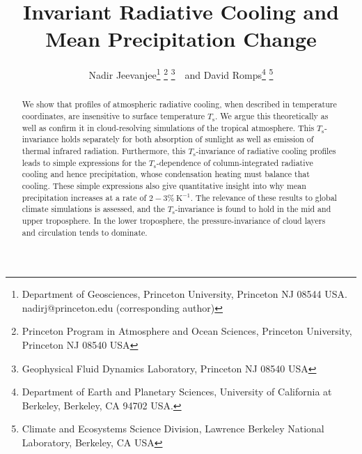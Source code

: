 \documentclass[10pt]{article}
\newcommand{\Ts}{\ensuremath{T_\mathrm{s}}}
\begin{document}
%
%


\title{Invariant Radiative Cooling and Mean Precipitation Change}

%
%


 \author{Nadir Jeevanjee\footnote{Department of Geosciences, Princeton University, Princeton NJ 08544 USA. nadirj@princeton.edu (corresponding author)} \footnote{Princeton Program in Atmosphere and Ocean Sciences, Princeton University, Princeton NJ 08540 USA} \footnote{Geophysical Fluid Dynamics Laboratory,  Princeton NJ  08540 USA}\ \    and David Romps\footnote{Department of Earth and Planetary Sciences, University of California at Berkeley, Berkeley, CA 94702  USA.} \footnote{Climate and Ecosystems Science Division, Lawrence Berkeley National Laboratory, Berkeley, CA USA}
}

\maketitle

\begin{abstract}
We show that  profiles of atmospheric radiative cooling, when described in temperature coordinates, are insensitive to surface temperature \Ts. We argue this theoretically as well as confirm it in cloud-resolving simulations of the tropical atmosphere. This \Ts-invariance holds separately for both absorption of sunlight as well as emission of thermal infrared radiation. Furthermore, this \Ts-invariance of radiative cooling profiles leads to simple expressions for the \Ts-dependence of column-integrated radiative cooling and hence precipitation, whose condensation heating must balance that cooling. These simple expressions also give quantitative insight into why mean precipitation increases at a rate of $2 -3\%\ \mathrm{K^{-1}}$.  The relevance of these results to global climate simulations is assessed, and the \Ts-invariance is found to hold in the mid and upper troposphere.  In the lower troposphere, the pressure-invariance of cloud layers and circulation tends to dominate.
%
%
\end{abstract}


%
%
\end{document}
